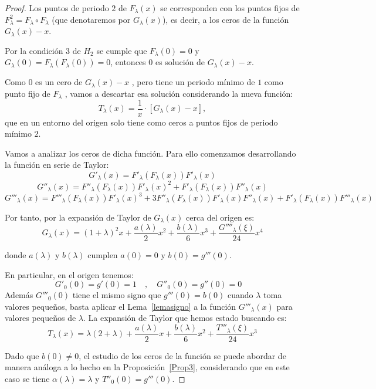 \documentclass[12pt,a4paper]{report}
\theoremstyle{definition}
\begin{document}
\begin{proof}
Los puntos de periodo \( 2 \) de \( F_{\lambda}(x) \) se corresponden con los puntos fijos de \( F^2_{\lambda} = F_{\lambda} \circ F_{\lambda} \) (que denotaremos por \( G_{\lambda}(x) \)), es decir, a los ceros de la función \( G_{\lambda}(x) - x \).

Por la condición 3 de \( H_2 \) se cumple que \( F_{\lambda}(0) = 0 \) y \( G_{\lambda}(0) = F_{\lambda}(F_{\lambda}(0)) = 0 \), entonces \( 0 \) es solución de \( G_{\lambda}(x) - x \).

Como $0$ es un cero de $G_\lambda(x)-x$ , pero tiene un periodo mínimo de $1$ como punto fijo de $F_\lambda$ , vamos a descartar esa solución considerando la nueva función:
\[
T_{\lambda}(x) = \frac{1}{x} \cdot [ G_{\lambda}(x) - x ],
\]
que en un entorno del origen solo tiene como ceros a puntos fijos de periodo mínimo \( 2 \). 

Vamos a analizar los ceros de dicha función. Para ello comenzamos desarrollando la función en serie de Taylor:
\[
G'_{\lambda}(x) = F'_{\lambda}(F_{\lambda}(x)) F'_{\lambda}(x)
\]
\[
G''_{\lambda}(x) = F''_{\lambda}(F_{\lambda}(x)) F'_{\lambda}(x)^2 + F'_{\lambda}(F_{\lambda}(x)) F''_{\lambda}(x)
\]
\[
G'''_{\lambda}(x) = F'''_{\lambda}(F_{\lambda}(x)) F'_{\lambda}(x)^3 + 3 F''_{\lambda}(F_{\lambda}(x)) F'_{\lambda}(x) F''_{\lambda}(x) + F'_{\lambda}(F_{\lambda}(x)) F'''_{\lambda}(x)
\]

Por tanto, por la expansión de Taylor de \( G_{\lambda}(x) \) cerca del origen es:
\[
G_{\lambda}(x) = (1 + \lambda)^2 x + \frac{a(\lambda)}{2} x^2 + \frac{b(\lambda)}{6} x^3 + \frac{G''''_{ \lambda}(\xi)}{24} x^4
\]


donde \( a(\lambda) \) y \( b(\lambda) \) cumplen \( a(0) = 0 \) y \( b(0) = g'''(0) \). 

En particular, en el origen tenemos:
\[
G'_0(0) = g'(0) = 1 \quad , \quad G''_0(0) = g''(0) = 0 \quad 
\]
Además $G'''_0(0)$  tiene el mismo signo que $ g'''(0) = b(0)$ cuando $\lambda$ toma valores pequeños, basta aplicar el Lema~\ref{lemasigno} a la función $G'''_\lambda(x)$ para valores pequeños de $\lambda$.
La expansión de Taylor que hemos estado buscando es:
\[
T_{\lambda}(x) = \lambda (2 + \lambda) + \frac{a(\lambda)}{2} x + \frac{b(\lambda)}{6} x^2 + \frac{T'''_{ \lambda}(\xi)}{24} x^3
\]

Dado que \( b(0) \neq 0 \), el estudio de los ceros de la función se puede abordar de manera análoga a lo hecho en la Proposición~\ref{Prop3}, considerando que en este caso se tiene \( \alpha(\lambda) = \lambda \) y \( T''_0(0) = g'''(0) \).  


\end{proof}
\end{document}
